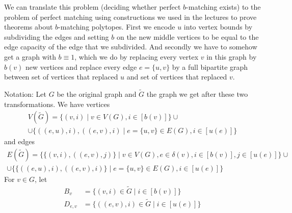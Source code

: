\begin{exercise}{3}
    
    We can translate this problem (deciding whether perfect $b$-matching exists)
    to the problem of perfect matching using constructions we used in the
    lectures to prove theorems about $b$-matching polytopes. First we encode $u$
    into vertex bounds by subdividing the edges and setting $b$ on the new
    middle vertices to be equal to the edge capacity of the edge that we
    subdivided. And secondly we have to somehow get a graph with $b \equiv 1$,
    which we do by replacing every vertex $v$ in this graph by $b(v)$ new
    vertices and replace every edge $e = \{u, v\}$ by a full bipartite graph
    between set of vertices that replaced $u$ and set of vertices that replaced
    $v$.


    Notation:
    Let $G$ be the original graph and $\tilde{G}$ the graph we get after these
    two transformations. We have vertices
    \begin{multline*}
        V(\tilde{G}) = \{ (v, i) \mid v \in V(G), i \in [b(v)] \} \cup \\
        \cup \{ ((e, u), i), ((e, v), i) \mid e = \{u, v\} \in E(G), i \in [u(e)] \}
    \end{multline*}
    and edges 
    \begin{multline*}
        E(\tilde{G}) = \{ \{ (v, i), ((e, v), j) \} \mid v \in V(G), e \in
        \delta(v), i \in [b(v)], j \in [u(e)] \} \cup \\
        \cup \{ \{ ((e, u), i), ((e, v), i) \} \mid e = \{u, v\} \in E(G), i \in [u(e)] \}
    \end{multline*}
    For $v \in G$, let
    \begin{align*} %
        B_v &= \{ (v, i) \in \tilde{G} \mid i \in [b(v)] \} \\
        D_{e, v} &= \{ ((e, v), i) \in \tilde{G} \mid i \in [u(e)] \} \\
    \end{align*}


\end{exercise}
